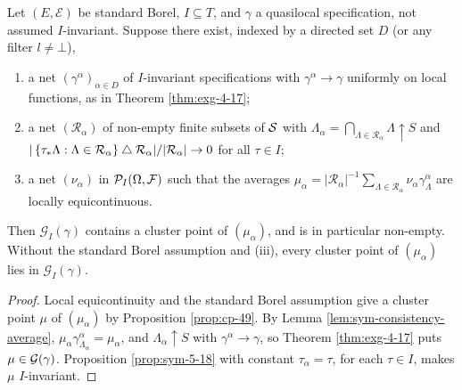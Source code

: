 \begin{theorem}[Georgii (5.19)]
    \label{thm:sym-5-19}
    \leanok

    Let $(E,\mathcal{E})$ be standard Borel, $I \subseteq T$, and $\gamma$ a quasilocal
    specification, not assumed $I$-invariant. Suppose there exist, indexed by a directed set $D$
    (or any filter $l \neq \bot$),
    \begin{enumerate}
        \item a net $(\gamma^\alpha)_{\alpha \in D}$ of $I$-invariant specifications with
              $\gamma^\alpha \to \gamma$ uniformly on local functions, as in
              Theorem \ref{thm:exg-4-17};
        \item a net $(\mathcal{R}_\alpha)$ of non-empty finite subsets of $\mathcal{S}$ with
              $\Lambda_\alpha = \bigcap_{\Lambda \in \mathcal{R}_\alpha} \Lambda \uparrow S$ and
              $|\left\{ \tau_*\Lambda : \Lambda \in \mathcal{R}_\alpha \right\} \mathbin{\triangle}
              \mathcal{R}_\alpha| / |\mathcal{R}_\alpha| \to 0$ for all $\tau \in I$;
        \item a net $(\nu_\alpha)$ in $\mathcal{P}_I(\Omega,\mathcal{F})$ such that the averages
              $\mu_\alpha = |\mathcal{R}_\alpha|^{-1}\sum_{\Lambda \in \mathcal{R}_\alpha}
              \nu_\alpha\gamma^\alpha_\Lambda$ are locally equicontinuous.
    \end{enumerate}
    Then $\mathcal{G}_I(\gamma)$ contains a cluster point of $(\mu_\alpha)$, and is in particular
    non-empty. Without the standard Borel assumption and (iii), every cluster point of
    $(\mu_\alpha)$ lies in $\mathcal{G}_I(\gamma)$.
\end{theorem}
\begin{proof}
    \leanok

    Local equicontinuity and the standard Borel assumption give a cluster point $\mu$ of
    $(\mu_\alpha)$ by Proposition \ref{prop:cp-49}. By
    Lemma \ref{lem:sym-consistency-average}, $\mu_\alpha \gamma^\alpha_{\Lambda_\alpha}
    = \mu_\alpha$, and $\Lambda_\alpha \uparrow S$ with $\gamma^\alpha \to \gamma$, so
    Theorem \ref{thm:exg-4-17} puts $\mu \in \mathcal{G}(\gamma)$. Proposition \ref{prop:sym-5-18}
    with constant $\tau_\alpha = \tau$, for each $\tau \in I$, makes $\mu$ $I$-invariant.
\end{proof}

